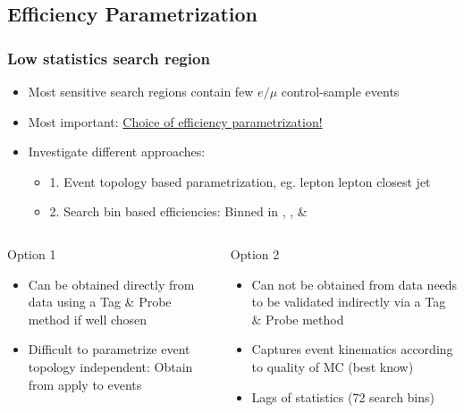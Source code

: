 \documentclass{beamer}
\begin{document}
\subsection{Efficiency Parametrization}
\begin{frame}
 \frametitle{Low statistics search region}
 \begin{itemize}
  \item Most sensitive search regions contain few $e/\mu$ control-sample events
  \item Most important: \underline{Choice of efficiency parametrization!}
  \item Investigate different approaches:
  \begin{itemize}
   \item 1. Event topology based parametrization, eg. \pt lepton \deltaR lepton closest jet
   \item 2. Search bin based efficiencies: Binned in \HT, \MHT, \NJets \& \BTags
  \end{itemize}
 \end{itemize}
 \noindent\makebox[\linewidth]{\rule{\textwidth}{0.4pt}}
 \begin{columns}
  \begin{column}{0.465\textwidth}
  Option 1
   \begin{itemize}
    \item Can be obtained directly from data using a Tag \& Probe method if well chosen
    \item Difficult to parametrize event topology independent: Obtain from \Zll apply to \ttbar \wpj events
   \end{itemize}

  \end{column}
  \begin{column}{0.535\textwidth}
     Option 2
   \begin{itemize}
    \item Can not be obtained from data needs to be validated indirectly via a Tag \& Probe method
    \item Captures event kinematics according to quality of MC (best know)
    \item Lags of statistics (72 search bins)
   \end{itemize}
  \end{column}

 \end{columns}
\end{frame}
\end{document}

